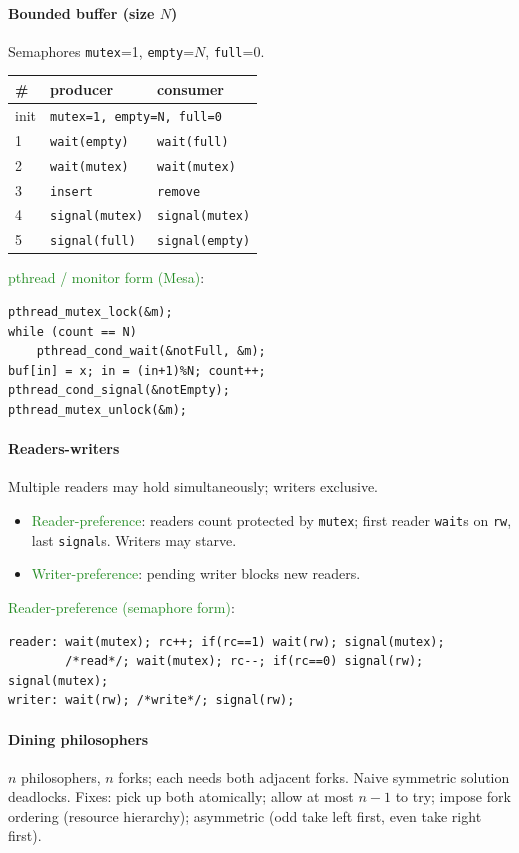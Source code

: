\paragraph{Bounded buffer (size $N$)}
Semaphores \texttt{mutex}=1, \texttt{empty}=$N$, \texttt{full}=0.
\begin{tabular}{@{}lll@{}}
\toprule
\# & producer & consumer \\
\midrule
init & \multicolumn{2}{l}{\texttt{mutex=1, empty=N, full=0}} \\
1 & \texttt{wait(empty)} & \texttt{wait(full)} \\
2 & \texttt{wait(mutex)} & \texttt{wait(mutex)} \\
3 & \texttt{insert} & \texttt{remove} \\
4 & \texttt{signal(mutex)} & \texttt{signal(mutex)} \\
5 & \texttt{signal(full)} & \texttt{signal(empty)} \\
\bottomrule
\end{tabular}
\textcolor{ForestGreen}{pthread / monitor form (Mesa)}:
\begin{verbatim}
pthread_mutex_lock(&m);
while (count == N)
    pthread_cond_wait(&notFull, &m);
buf[in] = x; in = (in+1)%N; count++;
pthread_cond_signal(&notEmpty);
pthread_mutex_unlock(&m);
\end{verbatim}

\paragraph{Readers-writers}
Multiple readers may hold simultaneously; writers exclusive.
\begin{itemize}
  \item \textcolor{ForestGreen}{Reader-preference}: readers count protected by \texttt{mutex}; first reader \texttt{wait}s on \texttt{rw}, last \texttt{signal}s. Writers may starve.
  \item \textcolor{ForestGreen}{Writer-preference}: pending writer blocks new readers.
\end{itemize}
\textcolor{ForestGreen}{Reader-preference (semaphore form)}:
\begin{verbatim}
reader: wait(mutex); rc++; if(rc==1) wait(rw); signal(mutex);
        /*read*/; wait(mutex); rc--; if(rc==0) signal(rw); signal(mutex);
writer: wait(rw); /*write*/; signal(rw);
\end{verbatim}

\paragraph{Dining philosophers}
$n$ philosophers, $n$ forks; each needs both adjacent forks. Naive symmetric solution \textcolor{Bittersweet}{deadlocks}. Fixes: pick up both atomically; allow at most $n-1$ to try; impose fork ordering (resource hierarchy); asymmetric (odd take left first, even take right first).

